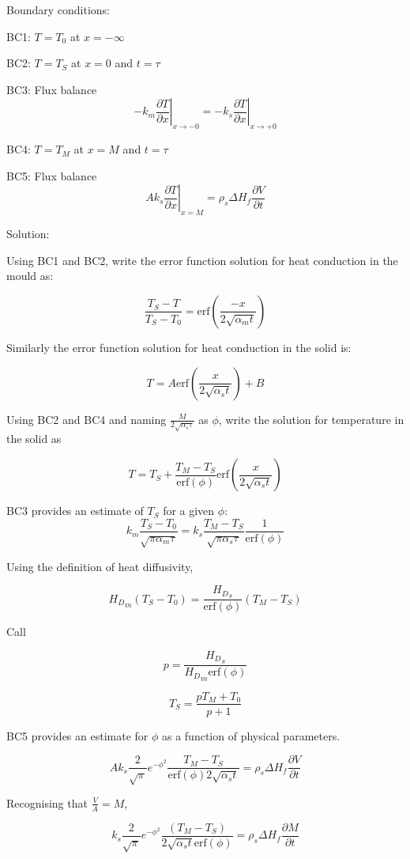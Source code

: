Boundary conditions:

BC1: $T=T_0$ at $x=-\infty$ 

BC2: $T=T_S$ at $x=0$ and $t=\tau$

BC3: Flux balance  
$$
-k_m \left. \frac{\partial T}{\partial x} \right|_{x \rightarrow -0} = -k_s
\left. \frac{\partial T}{\partial x} \right|_{x \rightarrow +0}
$$

BC4: $T=T_M$ at $x=M$ and $t=\tau$

BC5: Flux balance
$$
A k_s \left. \frac{\partial T}{\partial x} \right|_{x=M} = \rho_s \Delta H_f
\frac{\partial V}{\partial t}
$$

Solution:

Using BC1 and BC2, write the error function solution for heat conduction in the
mould as:

$$
\frac{T_S - T}{T_S - T_0} = \text{erf} (\frac{-x}{2\sqrt{\alpha_m t}})
$$

Similarly the error function solution for heat conduction in the solid is:

$$
T = A \text{erf}\left(\frac{x}{2\sqrt{\alpha_s t}} \right) + B
$$

Using BC2 and BC4 and naming $\frac{M}{2\sqrt{\alpha_s \tau}}$ as $\phi$, write
the solution for temperature in the solid as

$$
T = T_S + \frac{T_M - T_S}{\text{erf}(\phi)}
\text{erf}\left(\frac{x}{2\sqrt{\alpha_s t}} \right)
$$

BC3 provides an estimate of $T_S$ for a given $\phi$:
$$
k_m \frac{T_S - T_0}{\sqrt{\pi \alpha_m \tau}} = k_s \frac{T_M - T_S}{\sqrt{\pi
\alpha_s \tau}} \frac{1}{\text{erf}(\phi)}
$$

Using the definition of heat diffusivity,

$$
{H_D}_m (T_S - T_0) = \frac{{H_D}_s}{\text{erf}(\phi)} (T_M - T_S) 
$$

Call 

$$
p = \frac{{H_D}_s}{{H_D}_m \text{erf}(\phi)}
$$

$$
\boxed{
T_S = \frac{pT_M + T_0}{p+1}
}
$$

BC5 provides an estimate for $\phi$ as a function of physical parameters.

$$
A k_s \frac{2}{\sqrt{\pi}} e^{-\phi^2} \frac {T_M-T_S}{ \text{erf}(\phi) 2
\sqrt{\alpha_s t} } = \rho_s \Delta H_f \frac{\partial V}{\partial t}
$$

Recognising that $\frac{V}{A} = M$,

$$
k_s \frac{2}{\sqrt{\pi}} e^{-\phi^2} \frac {(T_M-T_S)}{2 \sqrt{\alpha_s t}
\text{erf}(\phi) } = \rho_s \Delta H_f \frac{\partial M}{\partial t}
$$

